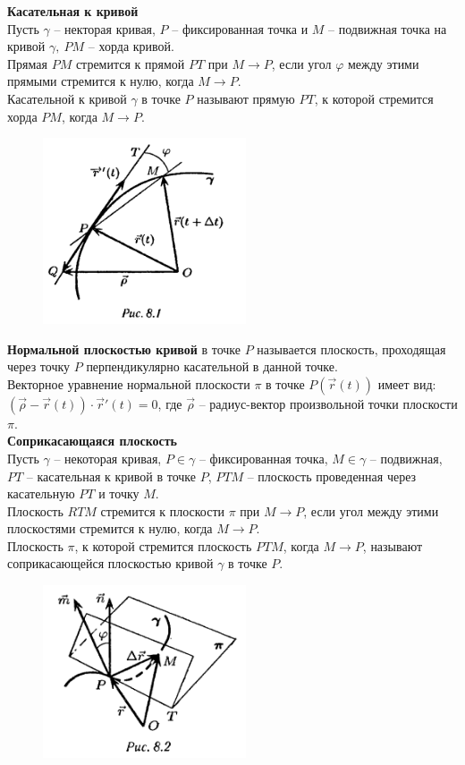 \documentclass{report}
\begin{document}
\noindent
\textbf{Касательная к кривой}\\
Пусть $\gamma$ -- некторая кривая, $P$ -- фиксированная точка и $M$ -- подвижная точка на кривой
$\gamma,\ PM$ -- хорда кривой.\\
Прямая $PM$ стремится к прямой $PT$ при $M \to P$, если угол $\varphi$ между этими прямыми стремится
к нулю, когда $M \to P$.\\
Касательной к кривой $\gamma$ в точке $P$ называют прямую $PT$, к которой стремится хорда $PM$,
когда $M \to P$.\\
\begin{figure}[ht!]
\centering
\includegraphics[width=60mm]{curve.png}
\end{figure}

\noindent
\textbf{Нормальной плоскостью кривой} в точке $P$ называется плоскость, проходящая через точку
$P$ перпендикулярно касательной в данной точке.\\
Векторное уравнение нормальной плоскости $\pi$ в точке $P(\overrightarrow{r}(t))$ имеет вид:
$(\overrightarrow{\rho} - \overrightarrow{r}(t)) \cdot \overrightarrow{r}'(t) = 0$, где 
$\overrightarrow{\rho}$ -- радиус-вектор произвольной точки плоскости $\pi$.\\

\newpage
\noindent
\textbf{Соприкасающаяся плоскость}\\
Пусть $\gamma$ -- некоторая кривая, $P \in \gamma$ -- фиксированная точка, $M \in \gamma$ --
подвижная, $PT$ -- касательная к кривой в точке $P$, $PTM$ -- плоскость проведенная через
касательную $PT$ и точку $M$.\\
Плоскость $RTM$ стремится к плоскости $\pi$ при $M \to P$, если угол между этими плоскостями
стремится к нулю, когда $M \to P$.\\
Плоскость $\pi$, к которой стремится плоскость $PTM$, когда $M \to P$, называют
соприкасающейся плоскостью кривой $\gamma$ в точке $P$.\\
\begin{figure}[ht!]
\centering
\includegraphics[width=60mm]{curve2.png}
\end{figure}
\end{document}

